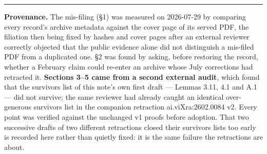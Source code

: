 \documentclass[11pt]{article}
\begin{document}
\vspace{4pt}
\noindent\rule{\textwidth}{0.8pt}

\noindent\footnotesize
\textbf{Provenance.} The mis-filing (\S1) was measured on 2026-07-29 by comparing every
record's archive metadata against the cover page of its served PDF, the filiation then
being fixed by hashes and cover pages after an external reviewer correctly objected
that the public evidence alone did not distinguish a mis-filed PDF from a duplicated
one. \S2 was found by asking, before restoring the record, whether a February claim
could re-enter an archive whose July corrections had retracted it. \textbf{Sections
3--5 came from a second external audit}, which found that the survivors list of this
note's own first draft --- Lemmas 3.11, 4.1 and A.1 --- did not survive; the same
reviewer had already caught an identical over-generous survivors list in the companion
retraction ai.viXra:2602.0084 v2. Every point was verified against the unchanged v1
proofs before adoption. That two successive drafts of two different retractions closed
their survivors lists too early is recorded here rather than quietly fixed: it is the
same failure the retractions are about.
\end{document}
